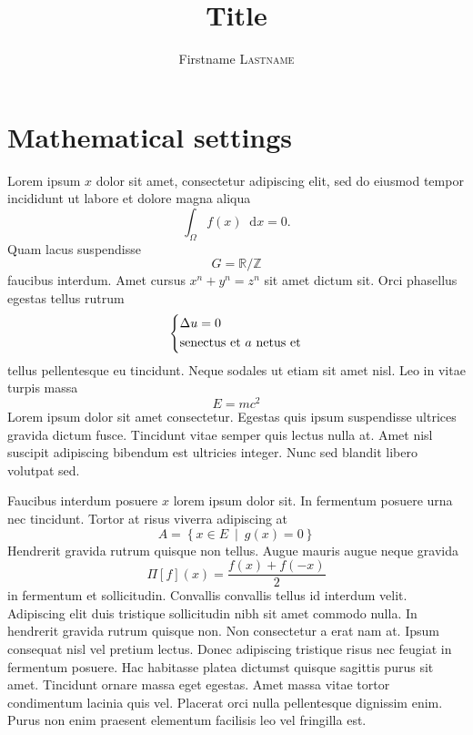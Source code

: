 \documentclass[12pt,a4paper]{article}
\title{Title}
\author{Firstname \textsc{Lastname}}
\date{}
\newcommand{\bbR}{\mathbb{R}}
\newcommand{\bbZ}{\mathbb{Z}}
\newcommand{\di}[1]{\mathop{}\!\mathrm{d}#1}
\newcommand{\setst}[2]{\left\lbrace#1\ \middle\vert\ #2\right\rbrace}
\theoremstyle{definition}
\theoremstyle{plain}
\theoremstyle{remark}
\begin{document}
\maketitle

\tableofcontents


\section{Mathematical settings}

Lorem ipsum \(x\) dolor sit amet, consectetur adipiscing elit, sed do eiusmod tempor incididunt ut labore et dolore magna aliqua
\[
    \int_\Omega f(x) \di{x} = 0.
\]
Quam lacus suspendisse \[G = \bbR / \bbZ\] faucibus interdum.
Amet cursus
\(
    x^n + y^n = z^n
\)
sit amet dictum sit.
Orci phasellus egestas tellus rutrum
\[
    \begin{dcases}
        \Delta u = 0 \\
        \text{senectus et \(a\) netus et}
    \end{dcases}
\]
tellus pellentesque eu tincidunt. Neque sodales ut etiam sit amet nisl.
Leo in vitae turpis massa
\[
    E = m c^2 %
\]
Lorem ipsum dolor sit amet consectetur.
Egestas quis ipsum suspendisse ultrices gravida dictum fusce.
Tincidunt vitae semper quis lectus nulla at.
Amet nisl suscipit adipiscing bibendum est ultricies integer.
Nunc sed blandit libero volutpat sed.

Faucibus interdum posuere \(x\) lorem ipsum dolor sit.
In fermentum posuere urna nec tincidunt.
Tortor at risus viverra adipiscing at
\[
    A = \setst{x \in E}{g(x) = 0} %
\]
Hendrerit gravida rutrum quisque non tellus.
Augue mauris augue neque gravida \[\Pi[f](x) = \frac{f(x) + f(-x)}{2}\] in fermentum et sollicitudin.
Convallis convallis tellus id interdum velit.
Adipiscing elit duis tristique sollicitudin nibh sit amet commodo nulla.
In hendrerit gravida rutrum quisque non.
Non consectetur a erat nam at.
Ipsum consequat nisl vel pretium lectus.
Donec adipiscing tristique risus nec feugiat in fermentum posuere.
Hac habitasse platea dictumst quisque sagittis purus sit amet.
Tincidunt ornare massa eget egestas.
Amet massa vitae tortor condimentum lacinia quis vel.
Placerat orci nulla pellentesque dignissim enim.
Purus non enim praesent elementum facilisis leo vel fringilla est.
\end{document}
